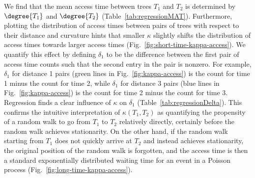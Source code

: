 \documentclass[11pt,onecolumn,conference]{IEEEtran}
\begin{document}
We find that the mean access time between trees $T_1$ and $T_2$ is determined by $\degree{T_1}$ and $\degree{T_2}$ (Table~\ref{tab:regressionMAT}).
Furthermore, plotting the distribution of access times between pairs of trees with respect to their distance and curvature hints that smaller $\kappa$ slightly shifts the distribution of access times towards larger access times (Fig.~\ref{fig:short-time-kappa-access}).
We quantify this effect by defining $\delta_1$ to be the difference between the first pair of access time counts such that the second entry in the pair is nonzero.
For example, $\delta_1$ for distance 1 pairs (green lines in Fig.~\ref{fig:kappa-access}) is the count for time 1 minus the count for time 2, while $\delta_1$ for distance 3 pairs (blue lines in Fig.~\ref{fig:kappa-access}) is the count for time 2 minus the count for time 3.
Regression finds a clear influence of $\kappa$ on $\delta_1$ (Table~\ref{tab:regressionDelta}).
This confirms the intuitive interpretation of $\kappa(T_1, T_2)$ as quantifying the propensity of a random walk to go from $T_1$ to $T_2$ relatively directly, certainly before the random walk achieves stationarity.
On the other hand, if the random walk starting from $T_1$ does not quickly arrive at $T_2$ and instead achieves stationarity, the original position of the random walk is forgotten, and the access time is then a standard exponentially distributed waiting time for an event in a Poisson process (Fig.~\ref{fig:long-time-kappa-access}).
\end{document}

